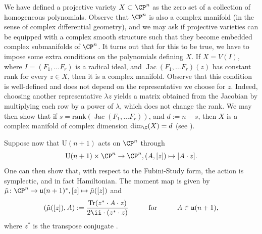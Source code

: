 We have defined a projective variety $X \subset \CP^n$ as the zero set of a collection of homogeneous polynomials. Observe that $\CP^n$ is also a complex manifold (in the sense of complex differential geometry), and we may ask if projective varieties can be equipped with a complex smooth structure such that they become embedded complex submanifolds of $\CP^n$. It turns out that for this to be true, we have to impose some extra conditions on the polynomials defining $X$. If $X=V(I)$, where $I=(F_1, \ldots F_r)$ is a radical ideal, and \(\operatorname{Jac}(F_1, \ldots F_r)(z)\) has constant rank for every $z \in X$, then it is a complex manifold. Observe that this condition is well-defined and does not depend on the representative we choose for $z$. Indeed, choosing another representative \(\lambda z\) yields a matrix obtained from the Jacobian by multiplying each row by a power of \(\lambda\), which does not change the rank. We may then show that if $s=\mathrm{rank}(\operatorname{Jac}(F_1, \ldots F_r))$, and $d:=n-s$, then $X$ is a complex manifold of complex dimension $\mathrm{dim}_\C(X)=d$ (see \parencite[Prop. 5.42]{munoz2020geometry}). 

Suppose now that \(\mathrm{U}(n+1)\) acts on \(\CP^{n}\) through 
\[
\mathrm{U}(n+1) \times \CP^n \to \CP^n, (A, [z]) \mapsto [A\cdot z].
\]
One can then show that, with respect to the Fubini-Study form, the action is symplectic, and in fact Hamiltonian. The moment map is given by \(\tilde\mu \colon \CP^n \to \mathfrak{u}(n+1)^*, [z] \mapsto \tilde{\mu}([z]) \) and
\begin{equation} \label{eq_mu_tilde}
    ( \tilde\mu([z]), A) :=\frac{\mathrm{Tr}(z^* \cdot A \cdot z)}{2 \ii \cdot (z^* \cdot z)} \hspace{1 cm} \text{for} \hspace{1 cm} A \in \mathfrak{u}(n+1),
\end{equation}
where \(z^*\) is the transpose conjugate \parencite[Ex. 8.10]{hoskins}. 

